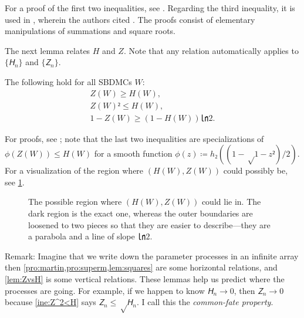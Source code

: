 \documentclass[openany]{amsbook}
\numberwithin{equation}{chapter}
\numberwithin{figure}{chapter}
\numberwithin{table}{chapter}
\def\bma#1{\begin{bmatrix}#1\end{bmatrix}}
\def\[#1\]{\begin{equation*}{#1}\end{equation*}}
\theoremstyle{definition}	理dfn:Definition~?s			理exa:Example~?s
\theoremstyle{remark}		理cla:Claim~?s				理rem:Remark~?s
\begin{document}
	For a proof of the first two inequalities, see \cite[Proposition~5]{Arikan09}.
	Regarding the third inequality, it is used in \cite[inequality~(5)]{MHU16},
	wherein the authors cited \cite[Exercise~4.62]{RU08}.
	The proofs consist of elementary manipulations of summations and square roots.
	
	The next lemma relates $H$ and $Z$.
	Note that any relation automatically applies to $\{𝘏_n\}$ and $\{𝘡_n\}$.
	
	\begin{lem}[$Z$ vs $H$]\label{lem:ZvsH}
		The following hold for all SBDMCs $W$:
		\begin{gather*}
			Z(W)≥H(W),			\\
			Z(W)²≤H(W),			\label{ine:Z^2<H}\\
			1-Z(W)≥(1-H(W))㏑2.	
		\end{gather*}
	\end{lem}
	
	For proofs, see \cite[Corollary~5]{JA18};
	note that the last two inequalities are specializations
	of $ϕ(Z(W))≤H(W)$ for a smooth function $ϕ(z)≔h₂((1-√{1-z²})/2)$.
	For a visualization of the region where $(H(W),Z(W))$
	could possibly be, see \cref{fig:ZvsH}.
	
	\begin{figure}
		\caption{
			The possible region where $(H(W),Z(W))$ could lie in.
			The dark region is the exact one, whereas the outer boundaries
			are loosened to two pieces so that they are easier to
			describe---they are a parabola and a line of slope $㏑2$.
		}\label{fig:ZvsH}
	\end{figure}
	
	Remark:
	Imagine that we write down the parameter processes in an infinite array
	\[\bma{
		𝘏₀	&	𝘏₁	&	𝘏₂	&	𝘏₃	&	⋯\quad{}	\\
		𝘡₀	&	𝘡₁	&	𝘡₂	&	𝘡₃	&	⋯\quad{}
	}\]
	then \cref{pro:martin,pro:superm,lem:squares} are some horizontal relations,
	and \cref{lem:ZvsH} is some vertical relations.
	These lemmas help us predict where the processes are going.
	For example, if we happen to know $𝘏_n→0$,
	then $𝘡_n→0$ because \cref{ine:Z^2<H} says $𝘡_n≤√{𝘏_n}$.
	I call this the \emph{common-fate property}.
	
\end{document}
